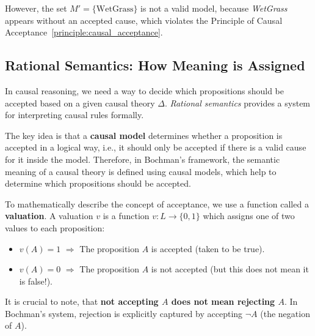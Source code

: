 \documentclass[seminar,palatino,english]{AIGpaper}
\newcommand{\ignore}[1]{}
\begin{document}
However, the set $  M' = \{ \text{WetGrass}\} $ is not a valid model, because \textit{WetGrass} appears without an accepted cause, which violates the Principle of Causal Acceptance~\ref{principle:causal_acceptance}.




\subsection{Rational Semantics: How Meaning is Assigned}

\ignore{
    \begin{itemize}
    \item $\Delta(u)$: direct causal effects.
        \item Fixed point: $v = \Delta(v)$.
        \item Semantics: set of causal models.
    \end{itemize}
}

In causal reasoning, we need a way to decide which propositions should be accepted based on a given causal theory $ \Delta $. \emph{Rational semantics} provides a system for interpreting causal rules formally. 

The key idea is that a \textbf{causal model} determines whether a proposition is accepted in a logical way, i.e., it should only be accepted if there is a valid cause for it inside the model. Therefore, in Bochman’s framework, the semantic meaning of a causal theory is defined using causal models, which help to determine which propositions should be accepted.

To mathematically describe the concept of acceptance, we use a function called a \textbf{valuation}. A valuation $ v $ is a function $  v: L \to \{0,1\} $ which assigns one of two values to each proposition:

\begin{itemize}
    \item $ v(A) = 1 $ \quad $\Rightarrow$ \quad The proposition $ A $ is accepted (taken to be true).
    \item $ v(A) = 0 $ \quad $\Rightarrow$ \quad The proposition $ A $ is not accepted (but this does not mean it is false!).
\end{itemize}

It is crucial to note, that \textbf{not accepting $ A $ does not mean rejecting $ A $}. In Bochman’s system, rejection is explicitly captured by accepting $ \neg A $ (the negation of $ A $).
\end{document}
